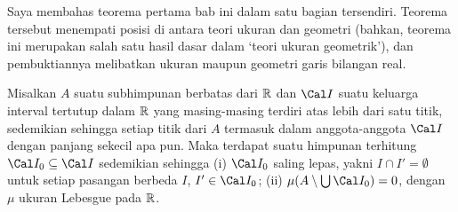
\def\chaptername{Teorema Dasar Kalkulus}
\def\sectionname{Teorema Vitali di $\Bbb R$}

\def\headlinesectionname{Teorema Vitali di $\eightBbb R$}

Saya membahas teorema pertama bab ini dalam satu bagian tersendiri.
Teorema tersebut menempati posisi di antara teori ukuran dan geometri
(bahkan, teorema ini merupakan salah satu hasil dasar dalam `teori ukuran
geometrik'), dan pembuktiannya melibatkan ukuran maupun
geometri garis bilangan real.

 Misalkan $A$ suatu subhimpunan berbatas dari
$\Bbb R$ dan $\Cal I$ suatu keluarga interval tertutup dalam
$\Bbb R$ yang masing-masing terdiri atas lebih dari satu titik, sedemikian
sehingga setiap titik dari $A$ termasuk dalam
anggota-anggota $\Cal I$ dengan panjang sekecil apa pun. Maka terdapat
suatu himpunan terhitung $\Cal I_0\subseteq\Cal I$ sedemikian sehingga (i)
$\Cal I_0$ saling lepas, yakni $I\cap I'=\emptyset$ untuk setiap pasangan
berbeda $I$, $I'\in\Cal I_0$; (ii)
$\mu(A\setminus\bigcup\Cal I_0)=0$, dengan $\mu$ ukuran Lebesgue pada
$\Bbb R$.


